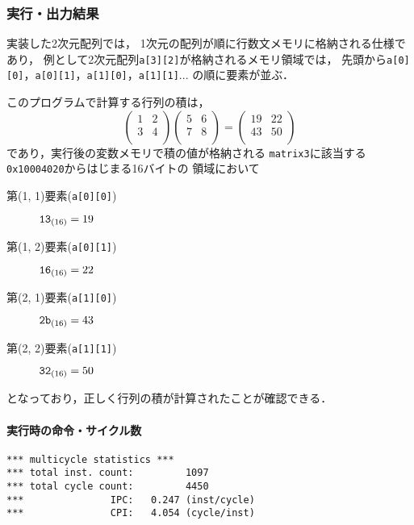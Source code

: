 \subsubsection{実行・出力結果}
実装した2次元配列では，
1次元の配列が順に行数文メモリに格納される仕様であり，
例として2次元配列\verb|a[3][2]|が格納されるメモリ領域では，
先頭から\verb|a[0][0]|，\verb|a[0][1]|，\verb|a[1][0]|，\verb|a[1][1]|...
の順に要素が並ぶ．

このプログラムで計算する行列の積は，
\begin{equation*}
  \begin{pmatrix}
    1 & 2 \\
    3 & 4 \\
  \end{pmatrix}
  \begin{pmatrix}
    5 & 6 \\
    7 & 8 \\
  \end{pmatrix}
  =
  \begin{pmatrix}
    19 & 22 \\
    43 & 50 \\
  \end{pmatrix}
\end{equation*}
であり，実行後の変数メモリで積の値が格納される
\verb|matrix3|に該当する\verb|0x10004020|からはじまる16バイトの
領域において
\begin{description}
  \item[第(1, 1)要素(\texttt{a[0][0]})] $\verb|13|_{(16)} = 19$  
  \item[第(1, 2)要素(\texttt{a[0][1]})] $\verb|16|_{(16)} = 22$  
  \item[第(2, 1)要素(\texttt{a[1][0]})] $\verb|2b|_{(16)} = 43$  
  \item[第(2, 2)要素(\texttt{a[1][1]})] $\verb|32|_{(16)} = 50$  
\end{description}
となっており，正しく行列の積が計算されたことが確認できる．

\paragraph*{実行時の命令・サイクル数}
\begin{Verbatim}[numbers=none, frame=single,
fontsize=\small, baselinestretch=0.8]
*** multicycle statistics ***
*** total inst. count:         1097
*** total cycle count:         4450
***               IPC:   0.247 (inst/cycle)
***               CPI:   4.054 (cycle/inst)
\end{Verbatim}

